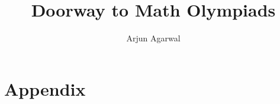 \documentclass{maaprb}
\title{Doorway to Math Olympiads}
\author{Arjun Agarwal}
\theoremstyle{definition}
\theoremstyle{remark}
\numberwithin{section}{chapter}
\numberwithin{equation}{chapter}
\begin{document}
\frontmatter
\maketitle
\mainmatter





\backmatter
\part{Appendix}
\clearpage
\end{document}
